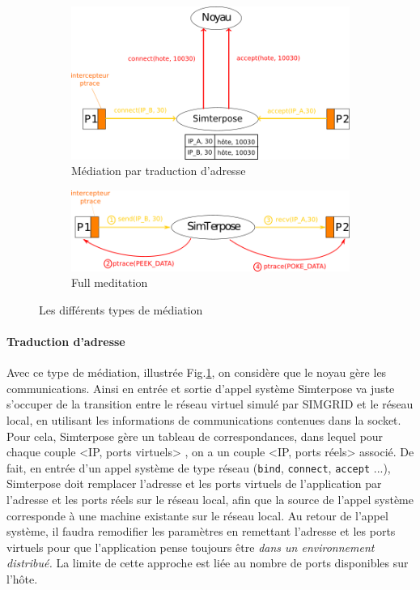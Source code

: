 \begin{figure}[H]
   \centering
   \begin{subfigure}{0.5\textwidth}
   \includegraphics[scale=0.5]{Pictures/png/Mediation_translation_v2}
   \caption{Médiation par traduction d'adresse}
   \label{ADDRESS_TRANSLATION}
   \end{subfigure}
   \begin{subfigure}{0.4\textwidth}
     \includegraphics[scale=0.5]{Pictures/png/Mediation_full_v2}
  \caption{Full meditation}
  \label{FULL_MEDIATION}
   \end{subfigure}
   \caption{Les différents types de médiation}
   \label{MEDIATION}
 \end{figure}
 
\paragraph{Traduction d'adresse}
 Avec ce type de médiation, illustrée Fig.\ref{ADDRESS_TRANSLATION}, on considère
 que le noyau gère les communications. Ainsi en entrée et sortie d'appel système
 Simterpose va juste s'occuper de la transition entre le réseau virtuel simulé
 par SIMGRID et le réseau local, en utilisant les informations de communications
 contenues dans la socket. Pour cela, Simterpose gère un tableau de
 correspondances, dans lequel pour chaque couple <IP, ports virtuels> , on a un
 couple <IP, ports réels> associé.  De fait, en entrée d'un appel système de
 type réseau (\texttt{bind}, \texttt{connect}, \texttt{accept} ...), Simterpose
 doit remplacer l'adresse et les ports virtuels de l'application par l'adresse
 et les ports réels sur le réseau local, afin que la source de l'appel système
 corresponde à une machine existante sur le réseau local. Au retour de l'appel
 système, il faudra remodifier les paramètres en remettant l'adresse et les
 ports virtuels pour que l'application pense toujours être \textit{dans un
   environnement distribué.}  La limite de cette approche est liée au nombre de
 ports disponibles sur l'hôte.

